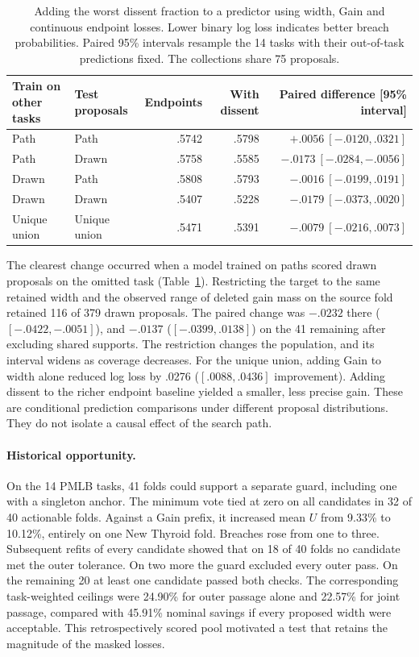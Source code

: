 \begin{table}[tb]
\centering
\caption{Adding the worst dissent fraction to a predictor using width, Gain and continuous endpoint losses. Lower binary log loss indicates better breach probabilities. Paired 95\% intervals resample the 14 tasks with their out-of-task predictions fixed. The collections share 75 proposals.}
\label{tab:strong-risk}
\small
\begin{tabular}{llrrr}
\toprule
Train on other tasks & Test proposals & Endpoints & With dissent & Paired difference [95\% interval]\\
\midrule
Path & Path & .5742 & .5798 & $+.0056\ [-.0120,.0321]$\\
Path & Drawn & .5758 & .5585 & $-.0173\ [-.0284,-.0056]$\\
Drawn & Path & .5808 & .5793 & $-.0016\ [-.0199,.0191]$\\
Drawn & Drawn & .5407 & .5228 & $-.0179\ [-.0373,.0020]$\\
Unique union & Unique union & .5471 & .5391 & $-.0079\ [-.0216,.0073]$\\
\bottomrule
\end{tabular}
\end{table}

The clearest change occurred when a model trained on paths scored drawn proposals on the omitted task (Table~\ref{tab:strong-risk}). Restricting the target to the same retained width and the observed range of deleted gain mass on the source fold retained 116 of 379 drawn proposals. The paired change was $-.0232$ there ($[-.0422,-.0051]$), and $-.0137$ ($[-.0399,.0138]$) on the 41 remaining after excluding shared supports. The restriction changes the population, and its interval widens as coverage decreases. For the unique union, adding Gain to width alone reduced log loss by .0276 ($[.0088,.0436]$ improvement). Adding dissent to the richer endpoint baseline yielded a smaller, less precise gain. These are conditional prediction comparisons under different proposal distributions. They do not isolate a causal effect of the search path.

\paragraph{Historical opportunity.}
On the 14 PMLB tasks, 41 folds could support a separate guard, including one with a singleton anchor. The minimum vote tied at zero on all candidates in 32 of 40 actionable folds. Against a Gain prefix, it increased mean $U$ from 9.33\% to 10.12\%, entirely on one New Thyroid fold. Breaches rose from one to three. Subsequent refits of every candidate showed that on 18 of 40 folds no candidate met the outer tolerance. On two more the guard excluded every outer pass. On the remaining 20 at least one candidate passed both checks. The corresponding task-weighted ceilings were 24.90\% for outer passage alone and 22.57\% for joint passage, compared with 45.91\% nominal savings if every proposed width were acceptable. This retrospectively scored pool motivated a test that retains the magnitude of the masked losses.

